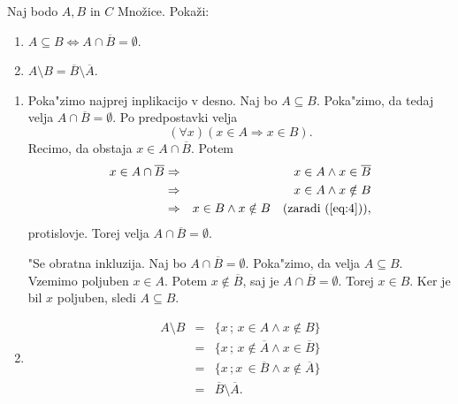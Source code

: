 \documentclass[11pt,paper=b5,footinclude,headinclude]{scrbook} %
\newtheorem{ex}{Vaja\hypertarget{sol:\theex}}[chapter]
\begin{document}
\begin{ex}
     Naj bodo $A, B$ in $C$ Množice. Pokaži:
\begin{enumerate}
\item  $A\subseteq B \Leftrightarrow A \cap \overline{B} = \emptyset$.
\item  $A\setminus B = \overline{B}\setminus \overline{A}$.
\end{enumerate}
\begin{sol}
    \begin{enumerate}
\item Poka"zimo najprej inplikacijo v desno. Naj bo $A\subseteq B$. Poka"zimo, da tedaj velja $A\cap \overline{B} = \emptyset$. Po predpostavki velja 
\begin{equation}\label{eq:4}
(\forall x)(x\in A \Rightarrow x\in B).
\end{equation}
Recimo, da obstaja $x\in A\cap \overline{B}$. Potem
\begin{eqnarray*}
x\in A\cap \overline{B} &\Rightarrow & x\in A \wedge x\in \overline{B}\\
						&\Rightarrow & x\in A \wedge x \notin B\\
						&\Rightarrow & x\in B \wedge x \notin B \quad (\textrm{zaradi } (\ref{eq:4})),
\end{eqnarray*}
protislovje. Torej velja $A\cap \overline{B}=\emptyset$.

"Se obratna inkluzija. Naj bo $A\cap \overline{B}=\emptyset$. Poka"zimo, da velja $A\subseteq B$. Vzemimo poljuben $x\in A$. Potem $x\notin \overline{B}$, saj je $A\cap \overline{B}=\emptyset$. Torej $x\in B$. Ker je bil $x$ poljuben, sledi $A\subseteq B$.


\item
\begin{eqnarray*}
A\setminus B & = & \{x\, ;\, x\in A \wedge x\notin B \}\\
             & = & \{x\, ;\, x\notin \overline{A} \wedge x  \in \overline{B} \}\\
             & = & \{x\, ; x\,  \in \overline{B} \wedge  x\notin \overline{A} \}\\
             & = & \overline{B} \setminus \overline{A}.
\end{eqnarray*}

\end{enumerate}

\end{sol}

\end{ex}
\end{document}

